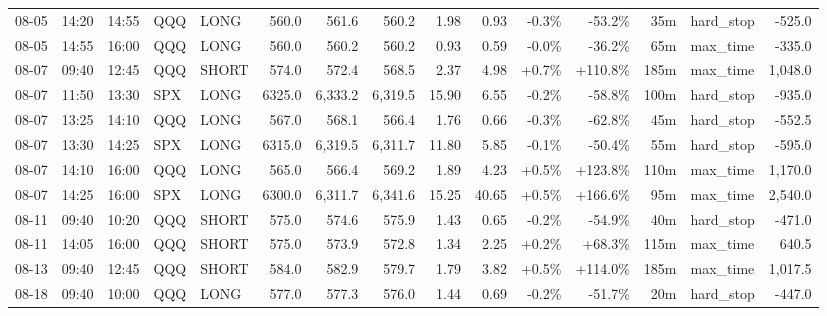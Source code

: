 \documentclass[11pt,a4paper,twoside]{article}
\begin{document}
\begin{landscape}
\begin{center}
\begin{longtable}{>{\color{txtmain}}l l l l l r r r r r r r r >{\color{txtmain}}l r}
08-05 & 14:20 & 14:55 & QQQ & LONG & 560.0 & 561.6 & 560.2 & 1.98 & 0.93 & \textcolor{lossred}{-0.3\%} & \textcolor{lossred}{-53.2\%} & 35m & hard\_stop & \textcolor{lossred}{-525.0} \\
08-05 & 14:55 & 16:00 & QQQ & LONG & 560.0 & 560.2 & 560.2 & 0.93 & 0.59 & \textcolor{lossred}{-0.0\%} & \textcolor{lossred}{-36.2\%} & 65m & max\_time & \textcolor{lossred}{-335.0} \\
08-07 & 09:40 & 12:45 & QQQ & SHORT & 574.0 & 572.4 & 568.5 & 2.37 & 4.98 & \textcolor{wingreen}{+0.7\%} & \textcolor{wingreen}{+110.8\%} & 185m & max\_time & \textcolor{wingreen}{1,048.0} \\
08-07 & 11:50 & 13:30 & SPX & LONG & 6325.0 & 6,333.2 & 6,319.5 & 15.90 & 6.55 & \textcolor{lossred}{-0.2\%} & \textcolor{lossred}{-58.8\%} & 100m & hard\_stop & \textcolor{lossred}{-935.0} \\
08-07 & 13:25 & 14:10 & QQQ & LONG & 567.0 & 568.1 & 566.4 & 1.76 & 0.66 & \textcolor{lossred}{-0.3\%} & \textcolor{lossred}{-62.8\%} & 45m & hard\_stop & \textcolor{lossred}{-552.5} \\
08-07 & 13:30 & 14:25 & SPX & LONG & 6315.0 & 6,319.5 & 6,311.7 & 11.80 & 5.85 & \textcolor{lossred}{-0.1\%} & \textcolor{lossred}{-50.4\%} & 55m & hard\_stop & \textcolor{lossred}{-595.0} \\
08-07 & 14:10 & 16:00 & QQQ & LONG & 565.0 & 566.4 & 569.2 & 1.89 & 4.23 & \textcolor{wingreen}{+0.5\%} & \textcolor{wingreen}{+123.8\%} & 110m & max\_time & \textcolor{wingreen}{1,170.0} \\
08-07 & 14:25 & 16:00 & SPX & LONG & 6300.0 & 6,311.7 & 6,341.6 & 15.25 & 40.65 & \textcolor{wingreen}{+0.5\%} & \textcolor{wingreen}{+166.6\%} & 95m & max\_time & \textcolor{wingreen}{2,540.0} \\
08-11 & 09:40 & 10:20 & QQQ & SHORT & 575.0 & 574.6 & 575.9 & 1.43 & 0.65 & \textcolor{lossred}{-0.2\%} & \textcolor{lossred}{-54.9\%} & 40m & hard\_stop & \textcolor{lossred}{-471.0} \\
08-11 & 14:05 & 16:00 & QQQ & SHORT & 575.0 & 573.9 & 572.8 & 1.34 & 2.25 & \textcolor{wingreen}{+0.2\%} & \textcolor{wingreen}{+68.3\%} & 115m & max\_time & \textcolor{wingreen}{640.5} \\
08-13 & 09:40 & 12:45 & QQQ & SHORT & 584.0 & 582.9 & 579.7 & 1.79 & 3.82 & \textcolor{wingreen}{+0.5\%} & \textcolor{wingreen}{+114.0\%} & 185m & max\_time & \textcolor{wingreen}{1,017.5} \\
08-18 & 09:40 & 10:00 & QQQ & LONG & 577.0 & 577.3 & 576.0 & 1.44 & 0.69 & \textcolor{lossred}{-0.2\%} & \textcolor{lossred}{-51.7\%} & 20m & hard\_stop & \textcolor{lossred}{-447.0} \\

\end{longtable}
\end{center}
\end{landscape}
\end{document}
